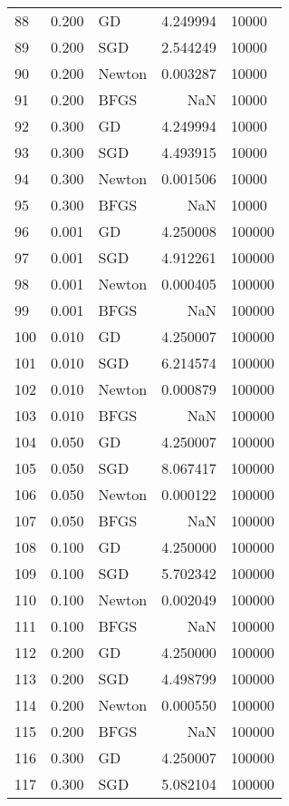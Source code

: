 \begin{tabular}{lrlrl}
88  &  0.200 &      GD &  4.249994 &    10000 \\
89  &  0.200 &     SGD &  2.544249 &    10000 \\
90  &  0.200 &  Newton &  0.003287 &    10000 \\
91  &  0.200 &    BFGS &       NaN &    10000 \\
92  &  0.300 &      GD &  4.249994 &    10000 \\
93  &  0.300 &     SGD &  4.493915 &    10000 \\
94  &  0.300 &  Newton &  0.001506 &    10000 \\
95  &  0.300 &    BFGS &       NaN &    10000 \\
96  &  0.001 &      GD &  4.250008 &   100000 \\
97  &  0.001 &     SGD &  4.912261 &   100000 \\
98  &  0.001 &  Newton &  0.000405 &   100000 \\
99  &  0.001 &    BFGS &       NaN &   100000 \\
100 &  0.010 &      GD &  4.250007 &   100000 \\
101 &  0.010 &     SGD &  6.214574 &   100000 \\
102 &  0.010 &  Newton &  0.000879 &   100000 \\
103 &  0.010 &    BFGS &       NaN &   100000 \\
104 &  0.050 &      GD &  4.250007 &   100000 \\
105 &  0.050 &     SGD &  8.067417 &   100000 \\
106 &  0.050 &  Newton &  0.000122 &   100000 \\
107 &  0.050 &    BFGS &       NaN &   100000 \\
108 &  0.100 &      GD &  4.250000 &   100000 \\
109 &  0.100 &     SGD &  5.702342 &   100000 \\
110 &  0.100 &  Newton &  0.002049 &   100000 \\
111 &  0.100 &    BFGS &       NaN &   100000 \\
112 &  0.200 &      GD &  4.250000 &   100000 \\
113 &  0.200 &     SGD &  4.498799 &   100000 \\
114 &  0.200 &  Newton &  0.000550 &   100000 \\
115 &  0.200 &    BFGS &       NaN &   100000 \\
116 &  0.300 &      GD &  4.250007 &   100000 \\
117 &  0.300 &     SGD &  5.082104 &   100000 \\

\end{tabular}
